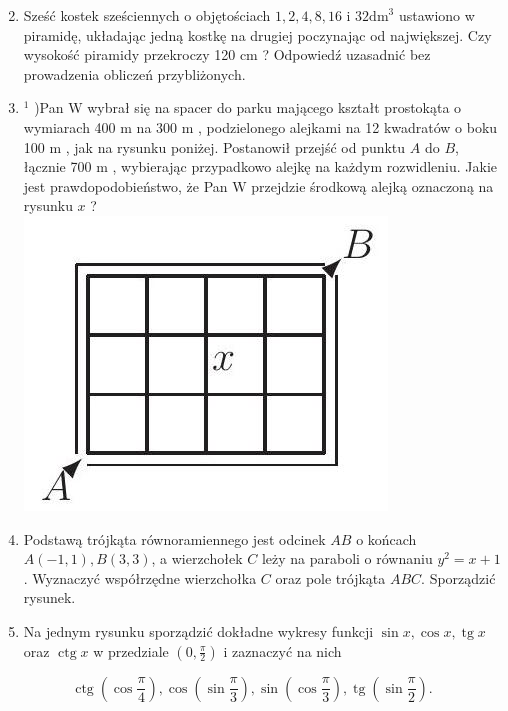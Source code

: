 \documentclass[10pt]{article}
\begin{document}
\begin{enumerate}
  \setcounter{enumi}{1}
  \item Sześć kostek sześciennych o objętościach $1,2,4,8,16$ i $32 \mathrm{dm}^{3}$ ustawiono w piramidę, układając jedną kostkę na drugiej poczynając od największej. Czy wysokość piramidy przekroczy 120 cm ? Odpowiedź uzasadnić bez prowadzenia obliczeń przybliżonych.
  \item ${ }^{1}$ )Pan W wybrał się na spacer do parku mającego kształt prostokąta o wymiarach 400 m na 300 m , podzielonego alejkami na 12 kwadratów o boku 100 m , jak na rysunku poniżej. Postanowił przejść od punktu $A$ do $B$, łącznie 700 m , wybierając przypadkowo alejkę na każdym rozwidleniu. Jakie jest prawdopodobieństwo, że Pan W przejdzie środkową alejką oznaczoną na rysunku $x$ ?\\
\includegraphics[max width=\textwidth, center]{2024_11_16_dea50acf0e4fa63c62acg-05}
  \item Podstawą trójkąta równoramiennego jest odcinek $A B$ o końcach $A(-1,1), B(3,3)$, a wierzchołek $C$ leży na paraboli o równaniu $y^{2}=x+1$. Wyznaczyć współrzędne wierzchołka $C$ oraz pole trójkąta $A B C$. Sporządzić rysunek.
  \item Na jednym rysunku sporządzić dokładne wykresy funkcji $\sin x, \cos x, \operatorname{tg} x$ oraz $\operatorname{ctg} x$ w przedziale $\left(0, \frac{\pi}{2}\right)$ i zaznaczyć na nich
\end{enumerate}

$$
\operatorname{ctg}\left(\cos \frac{\pi}{4}\right), \cos \left(\sin \frac{\pi}{3}\right), \sin \left(\cos \frac{\pi}{3}\right), \operatorname{tg}\left(\sin \frac{\pi}{2}\right) .
$$
\end{document}
